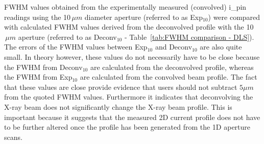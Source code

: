 FWHM values obtained from the experimentally measured (convolved) i\_pin readings using the 10$\,\mu m$ diameter aperture (referred to as Exp$_{\text{10}}$) were compared with calculated FWHM values derived from the deconvolved profile with the 10$\,\mu m$ aperture (referred to as Deconv$_{\text{10}}$ - Table~\ref{tab:FWHM comparison - DLS}).
The errors of the FWHM values between Exp$_{\text{10}}$ and Deconv$_{\text{10}}$ are also quite small.
In theory however, these values do not necessarily have to be close because the FWHM from Deconv$_{\text{10}}$ are calculated from the deconvolved profile, whereas the FWHM from Exp$_{\text{10}}$  are calculated from the convolved beam profile.
The fact that these values are close provide evidence that users should not subtract $5 \mu m$ from the quoted FWHM values.
Furthermore it indicates that deconvolving the X-ray beam does not significantly change the X-ray beam profile.
This is important because it suggests that the measured 2D current profile does not have to be further altered once the profile has been generated from the 1D aperture scans.
